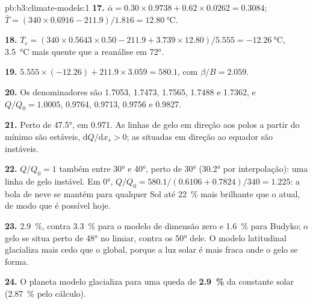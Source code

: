 \begin{solution}{pb:b3:climate-models:1}
\textbf{17.} $\bar\alpha = 0.30\times0.9738 + 0.62\times0.0262 =
\num{0.3084}$; $\bar T = (340\times0.6916 - 211.9)/1.816 =
\qty{12.80}{\celsius}$.

\textbf{18.} $T_c = (340\times0.5643\times0.50 - 211.9 + 3.739\times12.80)/
5.555 = \qty{-12.26}{\celsius}$, \qty{3.5}{\celsius} mais quente que a
reanálise em \ang{72}.

\textbf{19.} $5.555\times(-12.26) + 211.9\times3.059 = \num{580.1}$, com
$\beta/B = \num{2.059}$.

\textbf{20.} Os denominadores são 1.7053, 1.7473, 1.7565, 1.7488 e
1.7362, e $Q/Q_0 = \num{1.0005}$, \num{0.9764}, \num{0.9713},
\num{0.9756} e \num{0.9827}.

\textbf{21.} Perto de \ang{47.5}, em \num{0.971}. As linhas de gelo em direção
aos polos a partir do mínimo são estáveis, $\mathrm dQ/\mathrm dx_s > 0$; as
situadas em direção ao equador são instáveis.

\textbf{22.} $Q/Q_0 = 1$ também entre \ang{30} e \ang{40}, perto de
\ang{30} (\ang{30.2} por interpolação): uma linha de gelo instável. Em \ang{0},
$Q/Q_0 = 580.1/(0.6106 + 0.7824)/340 = \num{1.225}$: a bola de neve se mantém
para qualquer Sol até \qty{22}{\percent} mais brilhante que o atual, de modo que é
possível hoje.

\textbf{23.} \qty{2.9}{\percent}, contra \qty{3.3}{\percent} para o
modelo de dimensão zero e \qty{1.6}{\percent} para Budyko; o gelo se situa
perto de \ang{48} no limiar, contra os \ang{50} dele. O modelo latitudinal
glacializa mais cedo que o global, porque a luz solar é mais fraca onde
o gelo se forma.

\textbf{24.} O planeta modelo glacializa para uma queda de
\textbf{\qty[text-series-to-math=true]{2.9}{\percent}} da constante solar
(\qty{2.87}{\percent} pelo cálculo).
\end{solution}

